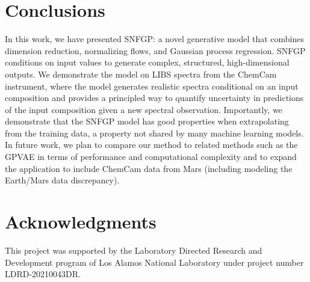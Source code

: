 \documentclass[letterpaper]{article} %
\begin{document}
\section{Conclusions}
In this work, we have presented SNFGP: a novel generative model that combines dimension reduction, normalizing flows, and Gaussian process regression.
SNFGP conditions on input values to generate complex, structured, high-dimensional outputs.
We demonstrate the model on LIBS spectra from the ChemCam instrument, where the model generates realistic spectra conditional on an input composition and provides a principled way to quantify uncertainty in predictions of the input composition given a new spectral observation.
Importantly, we demonstrate that the SNFGP model has good properties when extrapolating from the training data, a property not shared by many machine learning models.
In future work, we plan to compare our method to related methods such as the GPVAE in terms of performance and computational complexity and to expand the application to include ChemCam data from Mars (including modeling the Earth/Mars data discrepancy).





\section{Acknowledgments}
This project was supported by the Laboratory Directed Research and Development program of Los Alamos National Laboratory under project number LDRD-20210043DR.



\end{document}
